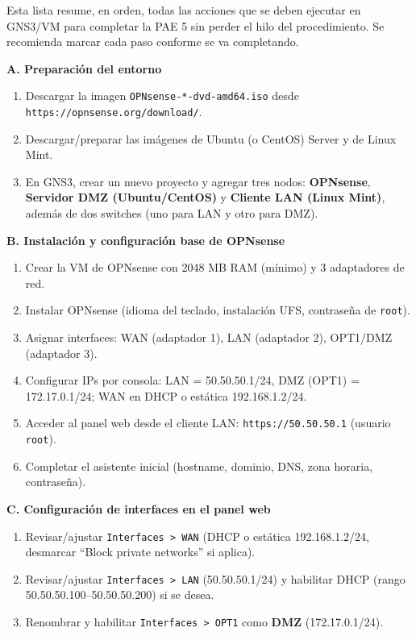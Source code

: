\documentclass{article}
\providecommand{\tightlist}{%
  \setlength{\itemsep}{0pt}\setlength{\parskip}{0pt}}
\renewcommand{\_}{\oldunderscore\hskip0pt\relax}
\begin{document}
Esta lista resume, en orden, todas las acciones que se deben ejecutar en
GNS3/VM para completar la PAE 5 sin perder el hilo del procedimiento. Se
recomienda marcar cada paso conforme se va completando.

\textbf{A. Preparación del entorno}

\begin{enumerate}
\def\labelenumi{\arabic{enumi}.}
\tightlist
\item
  Descargar la imagen \texttt{OPNsense-*-dvd-amd64.iso} desde
  \texttt{https://opnsense.org/download/}.
\item
  Descargar/preparar las imágenes de Ubuntu (o CentOS) Server y de Linux
  Mint.
\item
  En GNS3, crear un nuevo proyecto y agregar tres nodos:
  \textbf{OPNsense}, \textbf{Servidor DMZ (Ubuntu/CentOS)} y
  \textbf{Cliente LAN (Linux Mint)}, además de dos switches (uno para
  LAN y otro para DMZ).
\end{enumerate}

\textbf{B. Instalación y configuración base de OPNsense}

\begin{enumerate}
\def\labelenumi{\arabic{enumi}.}
\setcounter{enumi}{3}
\tightlist
\item
  Crear la VM de OPNsense con 2048 MB RAM (mínimo) y 3 adaptadores de
  red.
\item
  Instalar OPNsense (idioma del teclado, instalación UFS, contraseña de
  \texttt{root}).
\item
  Asignar interfaces: WAN (adaptador 1), LAN (adaptador 2), OPT1/DMZ
  (adaptador 3).
\item
  Configurar IPs por consola: LAN = 50.50.50.1/24, DMZ (OPT1) =
  172.17.0.1/24; WAN en DHCP o estática 192.168.1.2/24.
\item
  Acceder al panel web desde el cliente LAN: \texttt{https://50.50.50.1}
  (usuario \texttt{root}).
\item
  Completar el asistente inicial (hostname, dominio, DNS, zona horaria,
  contraseña).
\end{enumerate}

\textbf{C. Configuración de interfaces en el panel web}

\begin{enumerate}
\def\labelenumi{\arabic{enumi}.}
\setcounter{enumi}{9}
\tightlist
\item
  Revisar/ajustar \texttt{Interfaces\ \textgreater{}\ WAN} (DHCP o
  estática 192.168.1.2/24, desmarcar ``Block private networks'' si
  aplica).
\item
  Revisar/ajustar \texttt{Interfaces\ \textgreater{}\ LAN}
  (50.50.50.1/24) y habilitar DHCP (rango 50.50.50.100--50.50.50.200) si
  se desea.
\item
  Renombrar y habilitar \texttt{Interfaces\ \textgreater{}\ OPT1} como
  \textbf{DMZ} (172.17.0.1/24).
\end{enumerate}
\end{document}
